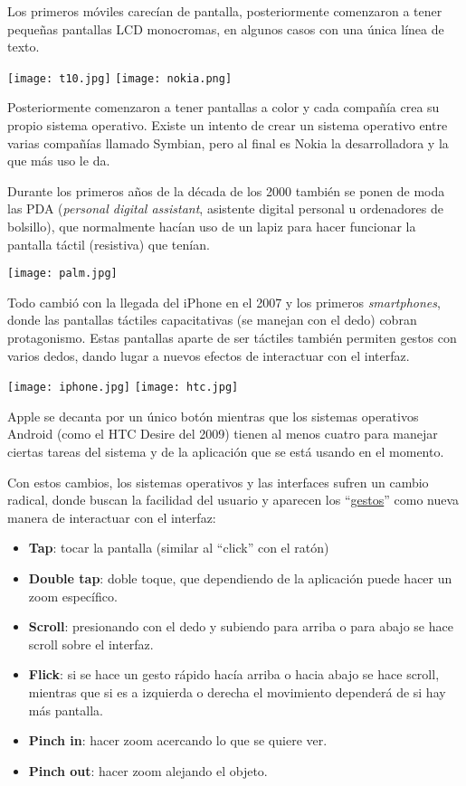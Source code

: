 Los primeros móviles carecían de pantalla, posteriormente comenzaron a tener pequeñas pantallas LCD monocromas, en algunos casos con una única línea de texto.


{
    \hfill
    \texttt{[image: t10.jpg]}
    \hfill
    \texttt{[image: nokia.png]}
    \hfill
}

Posteriormente comenzaron a tener pantallas a color y cada compañía crea su propio sistema operativo. Existe un intento de crear un sistema operativo entre varias compañías llamado Symbian, pero al final es Nokia la desarrolladora y la que más uso le da.

Durante los primeros años de la década de los 2000 también se ponen de moda las PDA (\textit{personal digital assistant}, asistente digital personal u ordenadores de bolsillo), que normalmente hacían uso de un lapiz para hacer funcionar la pantalla táctil (resistiva) que tenían.

\vspace{-10pt}
\begin{center}
    \texttt{[image: palm.jpg]}
\end{center}

Todo cambió con la llegada del iPhone en el 2007 y los primeros \textit{smartphones}, donde las pantallas táctiles capacitativas (se manejan con el dedo) cobran protagonismo. Estas pantallas aparte de ser táctiles también permiten gestos con varios dedos, dando lugar a nuevos efectos de interactuar con el interfaz.

{
    \hfill
    \texttt{[image: iphone.jpg]}
    \hfill
    \texttt{[image: htc.jpg]}
    \hfill
}

Apple se decanta por un único botón mientras que los sistemas operativos Android (como el HTC Desire del 2009) tienen al menos cuatro para manejar ciertas tareas del sistema y de la aplicación que se está usando en el momento.

Con estos cambios, los sistemas operativos y las interfaces sufren un cambio radical, donde buscan la facilidad del usuario y aparecen los “\href{https://en.wikipedia.org/wiki/Pointing_device_gesture#Touchpad_and_touchscreen_gestures}{gestos}” como nueva manera de interactuar con el interfaz:
\begin{itemize}
    \item \textbf{Tap}: tocar la pantalla (similar al “click” con el ratón)
    \item \textbf{Double tap}: doble toque, que dependiendo de la aplicación puede hacer un zoom específico.
    \item \textbf{Scroll}: presionando con el dedo y subiendo para arriba o para abajo se hace scroll sobre el interfaz.
    \item \textbf{Flick}: si se hace un gesto rápido hacía arriba o hacia abajo se hace scroll, mientras que si es a izquierda o derecha el movimiento dependerá de si hay más pantalla.
    \item \textbf{Pinch in}: hacer zoom acercando lo que se quiere ver.
    \item \textbf{Pinch out}: hacer zoom alejando el objeto.
\end{itemize}

